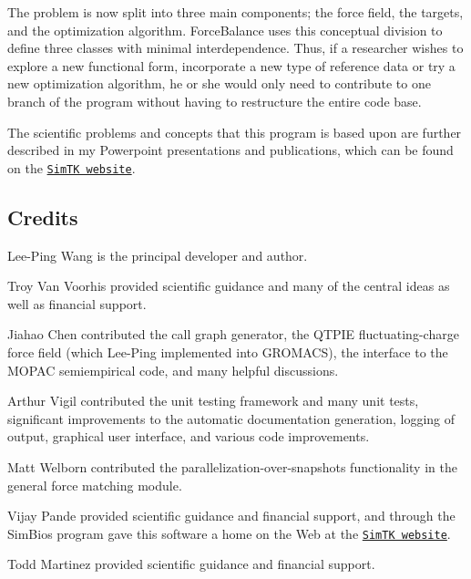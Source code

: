 The problem is now split into three main components; the force field, the targets, and the optimization algorithm. Force\-Balance uses this conceptual division to define three classes with minimal interdependence. Thus, if a researcher wishes to explore a new functional form, incorporate a new type of reference data or try a new optimization algorithm, he or she would only need to contribute to one branch of the program without having to restructure the entire code base.

The scientific problems and concepts that this program is based upon are further described in my Powerpoint presentations and publications, which can be found on the \href{https://simtk.org/home/forcebalance/}{\tt Sim\-T\-K website}.\hypertarget{index_credits}{}\subsection{Credits}\label{index_credits}

\begin{DoxyItemize}
\item Lee-\/\-Ping Wang is the principal developer and author.
\item Troy Van Voorhis provided scientific guidance and many of the central ideas as well as financial support.
\item Jiahao Chen contributed the call graph generator, the Q\-T\-P\-I\-E fluctuating-\/charge force field (which Lee-\/\-Ping implemented into G\-R\-O\-M\-A\-C\-S), the interface to the M\-O\-P\-A\-C semiempirical code, and many helpful discussions.
\item Arthur Vigil contributed the unit testing framework and many unit tests, significant improvements to the automatic documentation generation, logging of output, graphical user interface, and various code improvements.
\item Matt Welborn contributed the parallelization-\/over-\/snapshots functionality in the general force matching module.
\item Vijay Pande provided scientific guidance and financial support, and through the Sim\-Bios program gave this software a home on the Web at the \href{https://simtk.org/home/forcebalance/}{\tt Sim\-T\-K website}.
\item Todd Martinez provided scientific guidance and financial support. 
\end{DoxyItemize}